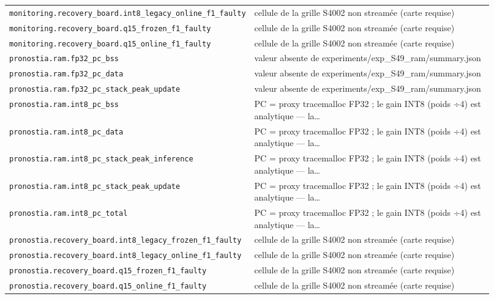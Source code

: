 \begin{table}[htbp]
\begin{tabular}{p{0.42\linewidth}p{0.5\linewidth}}
\texttt{monitoring.recovery\_board.int8\_legacy\_online\_f1\_faulty} & cellule de la grille S4002 non streamée (carte requise) \\
\texttt{monitoring.recovery\_board.q15\_frozen\_f1\_faulty} & cellule de la grille S4002 non streamée (carte requise) \\
\texttt{monitoring.recovery\_board.q15\_online\_f1\_faulty} & cellule de la grille S4002 non streamée (carte requise) \\
\texttt{pronostia.ram.fp32\_pc\_bss} & valeur absente de experiments/exp\_S49\_ram/summary.json \\
\texttt{pronostia.ram.fp32\_pc\_data} & valeur absente de experiments/exp\_S49\_ram/summary.json \\
\texttt{pronostia.ram.fp32\_pc\_stack\_peak\_update} & valeur absente de experiments/exp\_S49\_ram/summary.json \\
\texttt{pronostia.ram.int8\_pc\_bss} & PC = proxy tracemalloc FP32 ; le gain INT8 (poids ÷4) est analytique — la… \\
\texttt{pronostia.ram.int8\_pc\_data} & PC = proxy tracemalloc FP32 ; le gain INT8 (poids ÷4) est analytique — la… \\
\texttt{pronostia.ram.int8\_pc\_stack\_peak\_inference} & PC = proxy tracemalloc FP32 ; le gain INT8 (poids ÷4) est analytique — la… \\
\texttt{pronostia.ram.int8\_pc\_stack\_peak\_update} & PC = proxy tracemalloc FP32 ; le gain INT8 (poids ÷4) est analytique — la… \\
\texttt{pronostia.ram.int8\_pc\_total} & PC = proxy tracemalloc FP32 ; le gain INT8 (poids ÷4) est analytique — la… \\
\texttt{pronostia.recovery\_board.int8\_legacy\_frozen\_f1\_faulty} & cellule de la grille S4002 non streamée (carte requise) \\
\texttt{pronostia.recovery\_board.int8\_legacy\_online\_f1\_faulty} & cellule de la grille S4002 non streamée (carte requise) \\
\texttt{pronostia.recovery\_board.q15\_frozen\_f1\_faulty} & cellule de la grille S4002 non streamée (carte requise) \\
\texttt{pronostia.recovery\_board.q15\_online\_f1\_faulty} & cellule de la grille S4002 non streamée (carte requise) \\
\bottomrule
\end{tabular}
\end{table}
